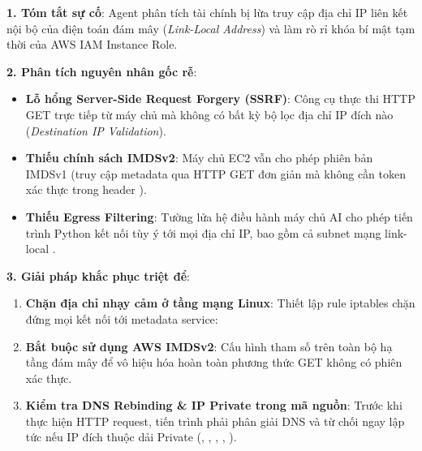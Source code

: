 \begin{debugbox}
\textbf{1. Tóm tắt sự cố}: Agent phân tích tài chính bị lừa truy cập địa chỉ IP liên kết nội bộ của điện toán đám mây (\textit{Link-Local Address})  và làm rò rỉ khóa bí mật tạm thời của AWS IAM Instance Role.

\textbf{2. Phân tích nguyên nhân gốc rễ}:
\begin{itemize}
  \item \textbf{Lỗ hổng Server-Side Request Forgery (SSRF)}: Công cụ  thực thi HTTP GET trực tiếp từ máy chủ mà không có bất kỳ bộ lọc địa chỉ IP đích nào (\textit{Destination IP Validation}).
  \item \textbf{Thiếu chính sách IMDSv2}: Máy chủ EC2 vẫn cho phép phiên bản IMDSv1 (truy cập metadata qua HTTP GET đơn giản mà không cần token xác thực trong header ).
  \item \textbf{Thiếu Egress Filtering}: Tường lửa hệ điều hành máy chủ AI cho phép tiến trình Python kết nối tùy ý tới mọi địa chỉ IP, bao gồm cả subnet mạng link-local .
\end{itemize}

\textbf{3. Giải pháp khắc phục triệt để}:
\begin{enumerate}
  \item \textbf{Chặn địa chỉ nhạy cảm ở tầng mạng Linux}: Thiết lập rule iptables chặn đứng mọi kết nối tới metadata service:
  \begin{center}
  \end{center}
  \item \textbf{Bắt buộc sử dụng AWS IMDSv2}: Cấu hình tham số  trên toàn bộ hạ tầng đám mây để vô hiệu hóa hoàn toàn phương thức GET không có phiên xác thực.
  \item \textbf{Kiểm tra DNS Rebinding \& IP Private trong mã nguồn}: Trước khi thực hiện HTTP request, tiến trình phải phân giải DNS và từ chối ngay lập tức nếu IP đích thuộc dải Private (, , , , ).
\end{enumerate}
\end{debugbox}

